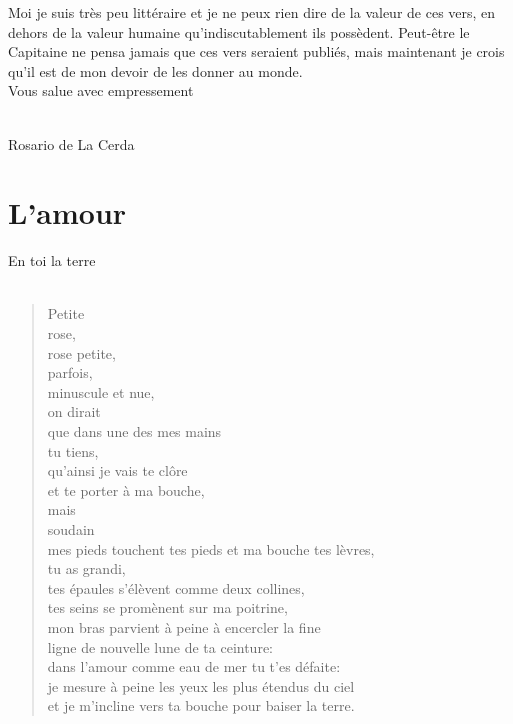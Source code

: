 \documentclass[11pt,a4paper]{book}
\begin{document}
{Moi je suis très peu littéraire et je ne peux rien dire de la valeur
de ces vers, en dehors de la valeur humaine qu'indiscutablement ils
possèdent. Peut-être le Capitaine ne pensa jamais que ces vers
seraient publiés, mais maintenant je crois qu'il est de mon devoir de
les donner au monde. \\

Vous salue avec empressement \\ \\
}

\hspace*{70mm} {\sc Rosario de La Cerda}

\cleardoublepage

\part{L'amour}

\cleardoublepage

{\huge En toi la terre} \\ \\

\begin{verse}
Petite \\
rose, \\
rose petite, \\
parfois, \\
minuscule et nue, \\
on dirait \\
que dans une des mes mains \\
tu tiens, \\
qu'ainsi je vais te clôre \\
et te porter à ma bouche, \\
mais \\
soudain \\
mes pieds touchent tes pieds et ma bouche tes lèvres, \\
tu as grandi, \\
tes épaules s'élèvent comme deux collines, \\
tes seins se promènent sur ma poitrine, \\
mon bras parvient à peine à encercler la fine \\
ligne de nouvelle lune de ta ceinture: \\
dans l'amour comme eau de mer tu t'es défaite: \\
je mesure à peine les yeux les plus étendus du ciel \\
et je m'incline vers ta bouche pour baiser la terre.
\end{verse}
\end{document}
